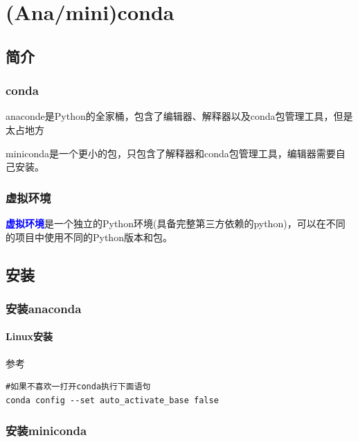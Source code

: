 \chapter{(Ana/mini)conda}
\section{简介}
\subsection{conda}
anaconde是Python的全家桶，包含了编辑器、解释器以及conda包管理工具，但是太占地方

miniconda是一个更小的包，\textcolor{YBXRed}{只}包含了解释器和conda包管理工具，编辑器需要自己安装。

\subsection{虚拟环境}
\textcolor{blue}{\textbf{虚拟环境}}是一个独立的Python环境(具备完整第三方依赖的python)，可以在不同的项目中使用不同的Python版本和包。
    
\section{安装}  
\subsection{安装anaconda}
\subsubsection{Linux安装}
参考\cite{Arch安装anaconda}
\begin{lstlisting}[style=demostyle,numbers=none]
#如果不喜欢一打开conda执行下面语句
conda config --set auto_activate_base false
\end{lstlisting}

\subsection{安装miniconda}
